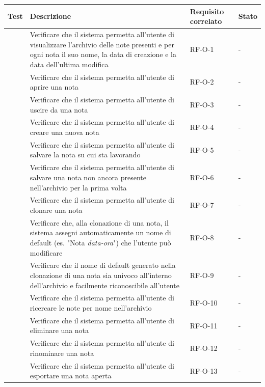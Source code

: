 \documentclass[a4paper,10pt]{article}
\begin{document}

\newcommand{\testS}{%
    \stepcounter{TS@}%
    \noindent{TS-\arabic{TS@}}\quad\par
}

\begin{longtable}{|l|p{8cm}|p{2cm}|p{1.5cm}|}
    \hline
    \textbf{Test} & \textbf{Descrizione} & \textbf{Requisito correlato} & \textbf{Stato} \\ \hline
    \endfirsthead
    \hline
    \testS & Verificare che il sistema permetta all'utente di visualizzare l'archivio delle note presenti e per ogni nota il suo nome, la data di creazione e la data dell'ultima modifica & RF-O-1 & - \\ \hline
    \testS & Verificare che il sistema permetta all'utente di aprire una nota & RF-O-2 & - \\ \hline
    \testS & Verificare che il sistema permetta all'utente di uscire da una nota & RF-O-3 & - \\ \hline
    \testS & Verificare che il sistema permetta all'utente di creare una nuova nota & RF-O-4 & - \\ \hline
    \testS & Verificare che il sistema permetta all'utente di salvare la nota su cui sta lavorando & RF-O-5 & - \\ \hline
    \testS & Verificare che il sistema permetta all'utente di salvare una nota non ancora presente nell'archivio per la prima volta & RF-O-6 & - \\ \hline
    \testS & Verificare che il sistema permetta all'utente di clonare una nota & RF-O-7 & - \\ \hline
    \testS & Verificare che, alla clonazione di una nota, il sistema assegni automaticamente un nome di default (es. "Nota \textit{data-ora}") che l’utente può modificare & RF-O-8 & - \\ \hline
    \testS & Verificare che il nome di default generato nella clonazione di una nota sia univoco all'interno dell'archivio e facilmente riconoscibile all'utente & RF-O-9 & - \\ \hline
    \testS & Verificare che il sistema permetta all'utente di ricercare le note per nome nell'archivio & RF-O-10 & - \\ \hline
    \testS & Verificare che il sistema permetta all'utente di eliminare una nota & RF-O-11 & - \\ \hline
    \testS & Verificare che il sistema permetta all'utente di rinominare una nota & RF-O-12 & - \\ \hline
    \testS & Verificare che il sistema permetta all'utente di esportare una nota aperta & RF-O-13 & - \\ \hline

\end{longtable}
\end{document}
